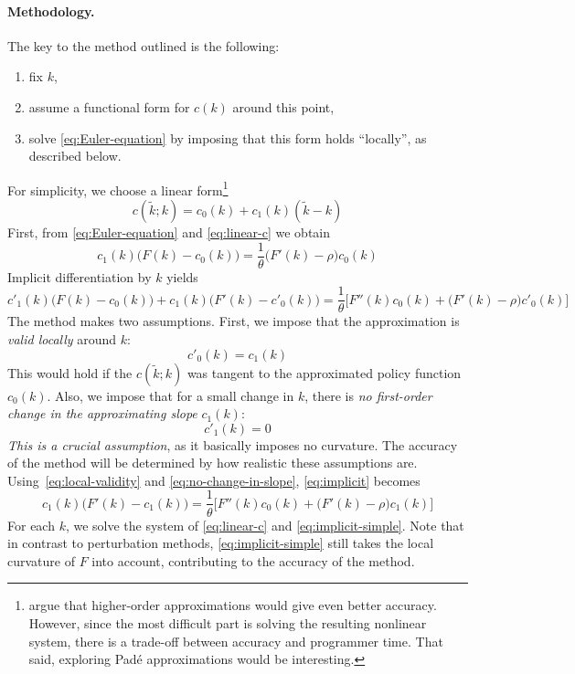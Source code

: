 \documentclass[a4paper,11pt]{article}
\newcommand{\tk}{\tilde{k}}
\begin{document}
\paragraph{Methodology.} The key to the method outlined is the following:
\begin{enumerate}
\item fix $k$,
\item assume a functional form for $c(k)$ around this point,
\item solve \eqref{eq:Euler-equation} by imposing that this form holds ``locally'', as described below.
\end{enumerate}
For simplicity, we choose a linear form\footnote{\textcite{den2015exact} argue that higher-order approximations would give even better accuracy. However, since the most difficult part is solving the resulting nonlinear system, there is a trade-off between accuracy and programmer time. That said, exploring Padé approximations would be interesting.}
\begin{equation}
  \label{eq:linear-c}
  c(\tk; k) = c_0(k) + c_1(k)(\tk-k)
\end{equation}
First, from \eqref{eq:Euler-equation} and \eqref{eq:linear-c} we obtain
\begin{equation}
  \label{eq:linear-Euler}
  c_1(k)\bigl( F(k) - c_0(k) \bigr) = \frac{1}{\theta}\bigl( F'(k) - \rho \bigr) c_0(k)
\end{equation}
Implicit differentiation by $k$ yields
\begin{equation}
  \label{eq:implicit}
  c'_1(k)\bigl( F(k) - c_0(k) \bigr) + c_1(k)\bigl( F'(k) - c'_0(k) \bigr) =
  \frac{1}{\theta}\biggl[ F''(k) c_0(k) + \bigl( F'(k) - \rho \bigr) c'_0(k) \biggr]
\end{equation}
The method makes two assumptions. First, we impose that the approximation is \emph{valid locally} around $k$:
\begin{equation}
  \label{eq:local-validity}
  c'_0(k) = c_1(k)
\end{equation}
This would hold if the $c(\tk;k)$ was tangent to the approximated policy function $c_0(k)$. Also, we impose that for a small change in $k$, there is \emph{no first-order change in the approximating slope} $c_1(k)$:
\begin{equation}
  \label{eq:no-change-in-slope}
  c'_1(k) = 0
\end{equation}
\emph{This is a crucial assumption}, as it basically imposes no curvature. The accuracy of the method will be determined by how realistic these assumptions are. Using~\eqref{eq:local-validity} and \eqref{eq:no-change-in-slope}, \eqref{eq:implicit} becomes
\begin{equation}
  \label{eq:implicit-simple}
  c_1(k)\bigl( F'(k) - c_1(k) \bigr) = \frac{1}{\theta}\biggl[ F''(k) c_0(k) + \bigl( F'(k) - \rho \bigr) c_1(k) \biggr]
\end{equation}
For each $k$, we solve the system of \eqref{eq:linear-c} and \eqref{eq:implicit-simple}.
Note that in contrast to perturbation methods, \eqref{eq:implicit-simple} still takes the local curvature of $F$ into account, contributing to the accuracy of the method.
\end{document}
